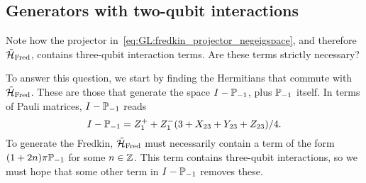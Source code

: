 \subsection{Generators with two-qubit interactions}
Note how the projector in~\cref{eq:GL:fredkin_projector_negeigspace}, and therefore $\tilde{{\mathcal{H}}}_{\operatorname{Fred}}$, contains three-qubit interaction terms.
Are these terms strictly necessary?

To answer this question, we start by finding the Hermitians that commute with $\tilde{{\mathcal{H}}}_{\operatorname{Fred}}$.
These are those that generate the space $I-\mathbb{P}_{-1}$, plus $\mathbb{P}_{-1}$ itself.
In terms of Pauli matrices, $I-\mathbb{P}_{-1}$ reads
\begin{equation}
    I - \mathbb{P}_{-1} = Z_1^+ + Z_1^- (3 + X_{23} + Y_{23} + Z_{23})/4.
\end{equation}
To generate the Fredkin, $\tilde{{\mathcal{H}}}_{\operatorname{Fred}}$ must necessarily contain a term of the form
$(1 + 2n)\pi \mathbb{P}_{-1}$ for some $n\in\mathbb{Z}$.
This term contains three-qubit interactions, so we must hope that some other term in $I-\mathbb{P}_{-1}$ removes these.



